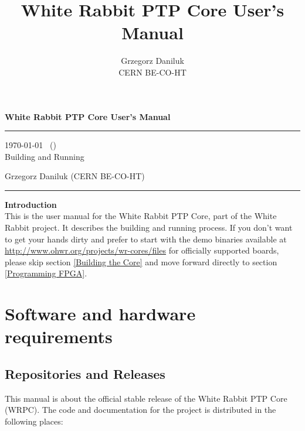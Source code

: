 \documentclass[a4paper, 12pt]{article}
\begin{document}

\title{White Rabbit PTP Core User's Manual}
\author{Grzegorz Daniluk\\ CERN BE-CO-HT}

\raggedright
{\LARGE {\bf White Rabbit PTP Core User's Manual}}\\[0.2 cm]
\hrule height 4pt \vspace{0.1cm}
\raggedleft
{\large \today ~ (\gitrevinfo)}\\
{\large Building and Running}\\
\vspace*{\fill}
\raggedright
{\large Grzegorz Daniluk (CERN BE-CO-HT)}\\
\hrule height 2pt
\justify

\newpage

\tableofcontents

\newpage

{\noindent \LARGE {\bf Introduction}}\\


This is the user manual for the White Rabbit PTP Core, part of the White
Rabbit project. It describes the building and running process. If you don't
want to get your hands dirty and prefer to start with the demo binaries
available at \url{http://www.ohwr.org/projects/wr-cores/files} for officially
supported boards, please skip section \ref{Building the Core} and move forward
directly to section \ref{Programming FPGA}.


\section{Software and hardware requirements}
\label{Software and hardware requirements}

\subsection{Repositories and Releases}
\label{Repositories and Releases}

This manual is about the official \gitrevinfo{} stable release of the White
Rabbit PTP Core (WRPC).  The code and documentation for the project is
distributed in the following places:
\end{document}

